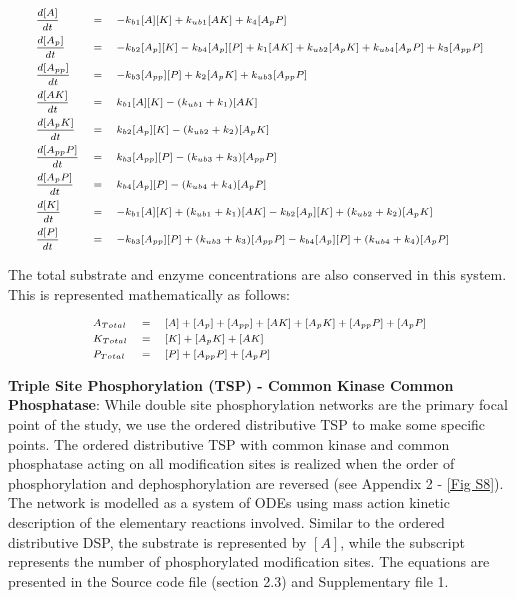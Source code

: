 \documentclass[9pt,lineno]{elife}
\begin{document}
\begin{appendixbox}
\begin{equation}
\scriptsize{
    \begin{alignedat}{3}
        &\frac{d[A]}{dt} \quad  &&= \quad -k_{b1}[A][K]+k_{ub1}[AK]+k_{4}[A_{p}P] && \\ 
        &\frac{d[A_p]}{dt} \quad  &&= \quad -k_{b2}[A_p][K]-k_{b4}[A_p][P]+k_{1}[AK]+k_{ub2}[A_{p}K]+k_{ub4}[A_{p}P]+k_{3}[A_{pp}P] && \\ 
        &\frac{d[A_{pp}]}{dt} \quad  &&= \quad -k_{b3}[A_{pp}][P]+k_{2}[A_{p}K]+k_{ub3}[A_{pp}P] && \\ 
        &\frac{d[AK]}{dt} \quad  &&= \quad k_{b1}[A][K]-(k_{ub1}+k_{1})[AK] && \\ 
        &\frac{d[A_{p}K]}{dt} \quad  &&= \quad k_{b2}[A_p][K]-(k_{ub2}+k_{2})[A_{p}K] && \\ 
        &\frac{d[A_{pp}P]}{dt} \quad  &&= \quad k_{b3}[A_{pp}][P]-(k_{ub3}+k_{3})[A_{pp}P] && \\ 
        &\frac{d[A_{p}P]}{dt} \quad  &&= \quad k_{b4}[A_p][P]-(k_{ub4}+k_{4})[A_{p}P] && \\ 
        &\frac{d[K]}{dt} \quad  &&= \quad -k_{b1}[A][K]+(k_{ub1}+k_{1})[AK]-k_{b2}[A_p][K]+(k_{ub2}+k_{2})[A_pK] && \\ 
        &\frac{d[P]}{dt} \quad  &&= \quad -k_{b3}[A_{pp}][P]+(k_{ub3}+k_{3})[A_{pp}P]-k_{b4}[A_p][P]+(k_{ub4}+k_4)[A_pP] && \\
    \end{alignedat} }
\end{equation}

The total substrate and enzyme concentrations are also conserved in this system. This is  represented mathematically as follows:

\begin{equation}
\scriptsize{
    \begin{alignedat}{3}
        & A_{Total} \quad  &&= \quad [A]+[A_p]+[A_{pp}]+[AK]+[A_pK]+[A_{pp}P]+[A_pP] && \\
        & K_{Total} \quad  &&= \quad [K]+[A_pK]+[AK] && \\
        & P_{Total} \quad  &&= \quad [P]+[A_{pp}P]+[A_pP] && \\
    \end{alignedat} }
\end{equation}

\textbf{Triple Site Phosphorylation (TSP) - Common Kinase Common Phosphatase}: While double site phosphorylation networks are the primary focal point of the study, we use the ordered distributive TSP to make some specific points.
The ordered distributive TSP with common kinase and common phosphatase acting on all modification sites is realized when the order of phosphorylation and dephosphorylation are reversed (see Appendix 2 - \cref{Fig S8}). The network is modelled as a system of ODEs using mass action kinetic description of the elementary reactions involved. Similar to the ordered distributive DSP, the substrate is represented by $[A]$, while the subscript represents the number of phosphorylated modification sites. The equations are presented in the Source code file (section 2.3) and Supplementary file 1.


\end{appendixbox}
\end{document}

